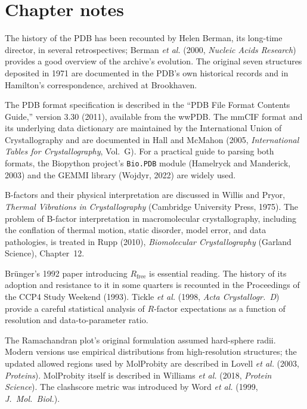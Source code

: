 \section{Chapter notes}
\label{sec:ch02-notes}

The history of the PDB has been recounted by Helen Berman, its long-time
director, in several retrospectives; Berman \textit{et al.} (2000,
\textit{Nucleic Acids Research}) provides a good overview of the archive's
evolution. The original seven structures deposited in 1971 are documented in
the PDB's own historical records and in Hamilton's correspondence, archived
at Brookhaven.

The PDB format specification is described in the ``PDB File Format Contents
Guide,'' version 3.30 (2011), available from the wwPDB. The mmCIF format
and its underlying data dictionary are maintained by the International Union
of Crystallography and are documented in Hall and McMahon (2005,
\textit{International Tables for Crystallography}, Vol.~G). For a practical
guide to parsing both formats, the Biopython project's \texttt{Bio.PDB}
module (Hamelryck and Manderick, 2003) and the GEMMI library (Wojdyr, 2022)
are widely used.

B-factors and their physical interpretation are discussed in Willis and
Pryor, \textit{Thermal Vibrations in Crystallography} (Cambridge University
Press, 1975). The problem of B-factor interpretation in macromolecular
crystallography, including the conflation of thermal motion, static disorder,
model error, and data pathologies, is treated in Rupp (2010),
\textit{Biomolecular Crystallography} (Garland Science), Chapter~12.

Br\"unger's 1992 paper introducing $R_{\mathrm{free}}$ is essential reading.
The history of its adoption and resistance to it in some quarters is
recounted in the Proceedings of the CCP4 Study Weekend (1993). Tickle
\textit{et al.} (1998, \textit{Acta Crystallogr.\ D}) provide a careful
statistical analysis of $R$-factor expectations as a function of resolution
and data-to-parameter ratio.

The Ramachandran plot's original formulation assumed hard-sphere radii. Modern
versions use empirical distributions from high-resolution structures; the
updated allowed regions used by MolProbity are described in Lovell
\textit{et al.} (2003, \textit{Proteins}). MolProbity itself is described in
Williams \textit{et al.} (2018, \textit{Protein Science}). The clashscore
metric was introduced by Word \textit{et al.} (1999, \textit{J.\ Mol.\
Biol.}).

